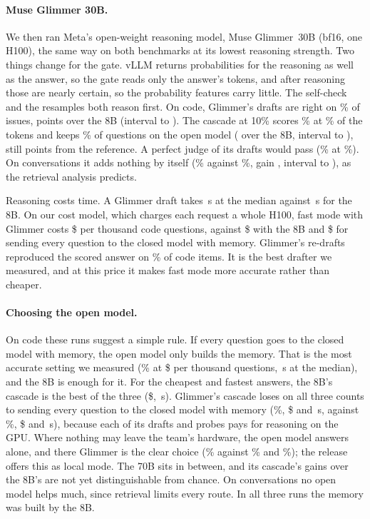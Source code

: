 \documentclass[10pt,twocolumn]{article}
\begin{document}
\paragraph{Muse Glimmer 30B.} We then ran Meta's open-weight reasoning model, Muse Glimmer~30B (bf16, one H100), the same way on both benchmarks at its lowest reasoning strength. Two things change for the gate. vLLM returns probabilities for the reasoning as well as the answer, so the gate reads only the answer's tokens, and after reasoning those are nearly certain, so the probability features carry little. The self-check and the resamples both reason first. On code, Glimmer's drafts are right on \glimAlone\% of issues, \glimGainAlone{} points over the 8B (interval \glimGainAloneLo{} to \glimGainAloneHi). The cascade at 10\% scores \glimCascadeTen\% at \glimShareTen\% of the tokens and keeps \glimKeptTen\% of questions on the open model (\glimGainCascade{} over the 8B, interval \glimGainCascadeLo{} to \glimGainCascadeHi), still \glimGapTen{} points from the reference. A perfect judge of its drafts would pass (\glimPerfect\% at \glimPerfectShare\%). On conversations it adds nothing by itself (\glimLocoAlone\% against \accLocoLlama\%, gain \glimLocoGainAlone, interval \glimLocoGainAloneLo{} to \glimLocoGainAloneHi), as the retrieval analysis predicts.

Reasoning costs time. A Glimmer draft takes \glimDraftMed\,s at the median against \smallDraftMed\,s for the 8B. On our cost model, which charges each request a whole H100, fast mode with Glimmer costs \$\glimUsd{} per thousand code questions, against \$\usdCascade{} with the 8B and \$\usdMemory{} for sending every question to the closed model with memory. Glimmer's re-drafts reproduced the scored answer on \glimSame\% of code items. It is the best drafter we measured, and at this price it makes fast mode more accurate rather than cheaper.

\paragraph{Choosing the open model.} On code these runs suggest a simple rule. If every question goes to the closed model with memory, the open model only builds the memory. That is the most accurate setting we measured (\accSweCompact\% at \$\usdMemory{} per thousand questions, \medMemory\,s at the median), and the 8B is enough for it. For the cheapest and fastest answers, the 8B's cascade is the best of the three (\$\usdCascade, \medCascade\,s). Glimmer's cascade loses on all three counts to sending every question to the closed model with memory (\glimCascadeTen\%, \$\glimUsd{} and \glimMed\,s, against \accSweCompact\%, \$\usdMemory{} and \medMemory\,s), because each of its drafts and probes pays for reasoning on the GPU. Where nothing may leave the team's hardware, the open model answers alone, and there Glimmer is the clear choice (\glimAlone\% against \bigAlone\% and \accSweLlama\%); the release offers this as local mode. The 70B sits in between, and its cascade's gains over the 8B's are not yet distinguishable from chance. On conversations no open model helps much, since retrieval limits every route. In all three runs the memory was built by the 8B.
\end{document}
